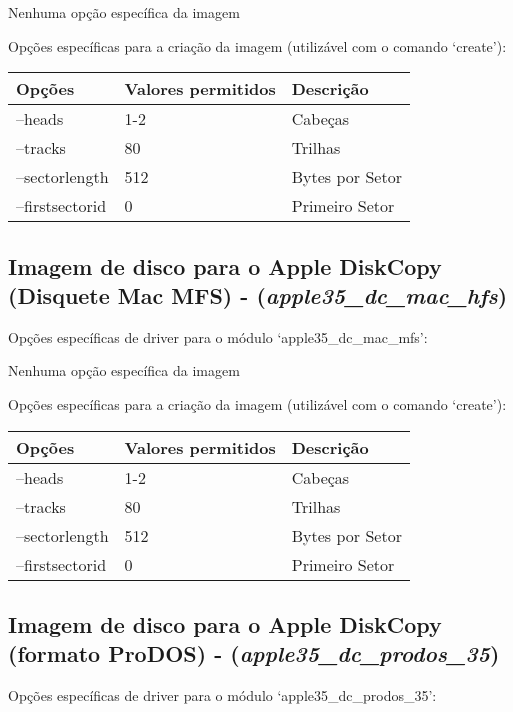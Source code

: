 \documentclass[letterpaper,10pt,brazil]{sphinxmanual}
\begin{document}
Nenhuma opção específica da imagem

Opções específicas para a criação da imagem (utilizável com o comando `create'):

\noindent\begin{tabulary}{\linewidth}{|L|L|L|}
\hline

Opções
&
Valores permitidos
&
Descrição
\\
\hline
--heads
&
1-2
&
Cabeças
\\
\hline
--tracks
&
80
&
Trilhas
\\
\hline
--sectorlength
&
512
&
Bytes por Setor
\\
\hline
--firstsectorid
&
0
&
Primeiro Setor
\\
\hline\end{tabulary}



\subsection{Imagem de disco para o Apple DiskCopy (Disquete Mac MFS) - (\emph{apple35\_dc\_mac\_hfs})}
\label{tools/imgtool:imagem-de-disco-para-o-apple-diskcopy-disquete-mac-mfs-apple35-dc-mac-hfs}
Opções específicas de driver para o módulo `apple35\_dc\_mac\_mfs':

Nenhuma opção específica da imagem

Opções específicas para a criação da imagem (utilizável com o comando `create'):

\noindent\begin{tabulary}{\linewidth}{|L|L|L|}
\hline

Opções
&
Valores permitidos
&
Descrição
\\
\hline
--heads
&
1-2
&
Cabeças
\\
\hline
--tracks
&
80
&
Trilhas
\\
\hline
--sectorlength
&
512
&
Bytes por Setor
\\
\hline
--firstsectorid
&
0
&
Primeiro Setor
\\
\hline\end{tabulary}



\subsection{Imagem de disco para o Apple DiskCopy (formato ProDOS) - (\emph{apple35\_dc\_prodos\_35})}
\label{tools/imgtool:imagem-de-disco-para-o-apple-diskcopy-formato-prodos-apple35-dc-prodos-35}
Opções específicas de driver para o módulo `apple35\_dc\_prodos\_35':
\end{document}
